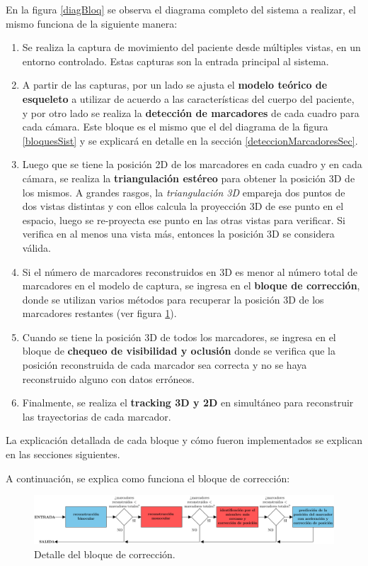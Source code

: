 En la figura \ref{diagBloq} se observa el diagrama completo del sistema a realizar, el mismo funciona de la siguiente manera:
\begin{enumerate}
\item Se realiza la captura de movimiento del paciente desde múltiples vistas, en un entorno controlado. Estas capturas son la entrada principal al sistema.
\item A partir de las capturas, por un lado se ajusta el \textbf{modelo teórico de esqueleto} a utilizar de acuerdo a las características del cuerpo del paciente, y por otro lado se realiza la \textbf{detección de marcadores} de cada cuadro para cada cámara. Este bloque es el mismo que el del diagrama de la figura \ref{bloquesSist} y se explicará en detalle en la sección \ref{deteccionMarcadoresSec}.
\item Luego que se tiene la posición 2D de los marcadores en cada cuadro y en cada cámara, se realiza la \textbf{triangulación estéreo} para obtener la posición 3D de los mismos. A grandes rasgos, la \emph{triangulación 3D} empareja dos puntos de dos vistas distintas y con ellos calcula la proyección 3D de ese punto en el espacio, luego se re-proyecta ese punto en las otras vistas para verificar. Si verifica en al menos una vista más, entonces la posición 3D se considera válida.
\item Si el número de marcadores reconstruidos en 3D es menor al número total de marcadores en el modelo de captura, se ingresa en el \textbf{bloque de corrección}, donde se utilizan varios métodos para recuperar la posición 3D de los marcadores restantes (ver figura \ref{fig:bloqCorr}). 
\item Cuando se tiene la posición 3D de todos los marcadores, se ingresa en el bloque de \textbf{chequeo de visibilidad y oclusión} donde se verifica que la posición reconstruida de cada marcador sea correcta y no se haya reconstruido alguno con datos erróneos.
\item Finalmente, se realiza el \textbf{tracking 3D y 2D} en simultáneo para reconstruir las trayectorias de cada marcador.
\end{enumerate}

La explicación detallada de cada bloque y cómo fueron implementados se explican en las secciones siguientes.

A continuación, se explica como funciona el bloque de corrección:

\begin{figure}[H]
\begin{center}
\includegraphics[scale=0.25]{img/Sistema_completo/BloquesDeCorreccion}
\end{center}
\caption{Detalle del bloque de corrección.}
\label{fig:bloqCorr}
\end{figure}

